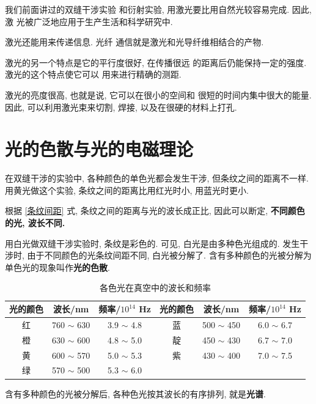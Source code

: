 \documentclass[11pt,a4paper]{ctexbook}
\begin{document}
我们前面讲过的双缝干涉实验
和衍射实验, 用激光要比用自然光较容易完成. 因此, 激
光被广泛地应用于生产生活和科学研究中.

激光还能用来传递信息. 光纤
通信就是激光和光导纤维相结合的产物.

激光的另一个特点是它的平行度很好, 在传播很远
的距离后仍能保持一定的强度. 激光的这个特点使它可以
用来进行精确的测距.

激光的亮度很高, 也就是说, 它可以在很小的空间和
很短的时间内集中很大的能量. 因此, 可以利用激光束来切割, 焊接,
以及在很硬的材料上打孔.

\section{光的色散与光的电磁理论}
\label{光的电磁理论}

在双缝干涉的实验中, 各种颜色的单色光都会发生干涉, 但条纹之间的距离不一样.
用黄光做这个实验, 条纹之间的距离比用红光时小, 用蓝光时更小.

根据 \eqref{条纹间距} 式, 条纹之间的距离与光的波长成正比, 因此可以断定,
\textbf{不同颜色的光, 波长不同.}

用白光做双缝干涉实验时, 条纹是彩色的. 可见, 白光是由多种色光组成的.
发生干涉时, 由于不同颜色的光条纹间距不同, 白光被分解了.
含有多种颜色的光被分解为单色光的现象叫作\textbf{光的色散}.

\begin{table}[h!]
 \begin{center}
   \caption{各色光在真空中的波长和频率}
   \label{各色光在真空中的波长和频率}
   \begin{tabular}{|c|c|c||c|c|c|}
    \hline
     \textbf{光的颜色} & \textbf{波长/nm} & \textbf{频率/$10^{14}$ Hz} & \textbf{光的颜色} & \textbf{波长/nm} & \textbf{频率/$10^{14}$ Hz}\\
     \hline
     红 & 760 $\sim$ 630 & 3.9 $\sim$ 4.8 & 蓝 & 500 $\sim$ 450 &6.0 $\sim$ 6.7\\
     \hline
     橙 & 630 $\sim$ 600 & 4.8 $\sim$ 5.0 & 靛 & 450 $\sim$ 430 &6.7 $\sim$ 7.0\\
     \hline
     黄 & 600 $\sim$ 570 & 5.0 $\sim$ 5.3 & 紫 & 430 $\sim$ 400 &7.0 $\sim$ 7.5\\
     \hline
     绿 & 570 $\sim$ 500 & 5.3 $\sim$ 6.0 & & &\\
     \hline
   \end{tabular}
 \end{center}
\end{table}

含有多种颜色的光被分解后, 各种色光按其波长的有序排列, 就是\textbf{光谱}.
\end{document}
